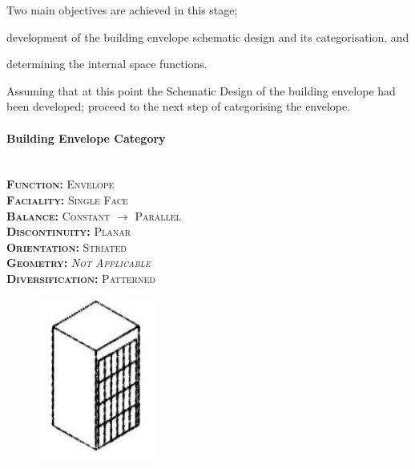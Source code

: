 Two main objectives are achieved in this stage; \begin{inparaenum}[a)] \item development of the building envelope schematic design and its categorisation, and \item determining the internal space functions.\end{inparaenum}

Assuming that at this point the Schematic Design of the building envelope had been developed; proceed to the next step of categorising the envelope.

\setlength{\columnseprule}{0pt}
\begin{multicols}{2}
	\paragraph{Building Envelope Category}\mbox{}\\
	\vspace {0.5cm}	
	\small \textsc{\textbf{Function:} Envelope\\
	\vspace {0.3cm}
	\textbf{Faciality:} Single Face\\
	\vspace {0.3cm}
	\textbf{Balance:} Constant $\rightarrow$ Parallel\\
	\vspace {0.3cm}
	\textbf{Discontinuity:} Planar\\
	\vspace {0.3cm}
	\textbf{Orientation:} Striated\\
	\vspace {0.3cm}
	\textbf{Geometry:} \emph{Not Applicable}\\
	\vspace {0.3cm}
	\textbf{Diversification:} Patterned\\}
	\normalsize
	\columnbreak
	\begin{figure}[H]
		\centering
		\includegraphics[width=0.35\textwidth]{./Images/10-Envelope1}
	\end{figure}
\end{multicols}
\vspace{-5mm}

